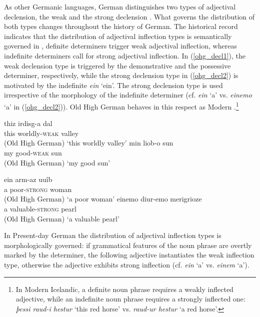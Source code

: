 \documentclass[output=paper
	        ,collection
	        ,collectionchapter
 	        ,biblatex
                ,babelshorthands
                ,newtxmath
                ,draftmode
                ,colorlinks, citecolor=brown
]{./langsci/langscibook}
\begin{document}
As other Germanic languages, German distinguishes two types of adjectival declension, \ie the weak and the strong declension \citep{VeSlPe2014}. What governs the distribution of both types changes throughout the history of German. The historical record indicates that the distribution of adjectival inflection types is semantically governed in , \ie definite determiners trigger weak adjectival inflection, whereas indefinite determiners call for strong adjectival inflection. In (\ref{ohg_decl1}), the weak declension type is triggered by the demonstrative and the possessive determiner, respectively, while the strong declension type in (\ref{ohg_decl2}) is motivated by the indefinite \textit{ein} `ein'. The strong declension type is used irrespective of the morphology of the indefinite determiner (cf. \textit{ein} `a' vs. \textit{einemo} `a' in (\ref{ohg_decl2})). Old High German behaves in this respect as Modern .\footnote{In Modern Icelandic, a definite noun phrase requires a weakly inflected adjective, while an indefinite noun phrase requires a strongly inflected one: \textit{þessi raud-i hestur} `this red horse' vs. \textit{raud-ur hestur} `a red horse'.} 

      
\eal \label{ohg_decl1}
\ex
\gll thiz irdisg-a dal \\  this worldly-\textsc{weak}{} valley \\ \hfill (Old High German)
\glt `this worldly valley'
\ex
\gll min liob-o sun \\ my good-\textsc{weak} sun \\  \hfill (Old High German)
\glt `my good sun'
\zl

\eal \label{ohg_decl2}
\ex 
\gll ein arm-az uuîb \\ a poor-\textsc{strong} woman \\ \hfill (Old High German)
\glt `a poor woman'
\ex 
\gll einemo diur-emo merigrioze \\ a valuable-\textsc{strong} pearl \\ \hfill (Old High German)
\glt `a valuable pearl'

\zl
In Present-day German the distribution of adjectival inflection types is morphologically governed: if grammatical features of the noun phrase are overtly marked by the determiner, the following adjective instantiates the weak inflection type, otherwise the adjective exhibits strong inflection (cf. \textit{ein} `a' vs. \textit{einem} `a').
       
\end{document}
